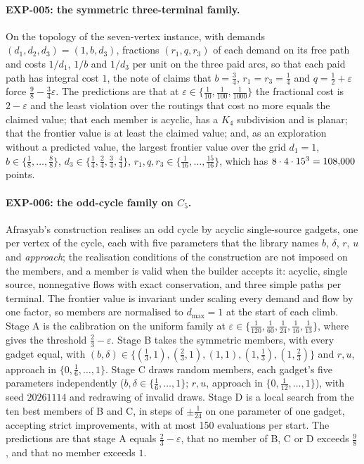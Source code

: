 \documentclass[11pt]{article}
\theoremstyle{remark}
\newcommand{\EXP}[1]{\mbox{EXP-#1}}
\newcommand{\dmax}{d_{\max}}
\begin{document}
\paragraph{\EXP{005}: the symmetric three-terminal family.} On the topology of the seven-vertex instance, with demands $(d_1,d_2,d_3)=(1,b,d_3)$, fractions $(r_1,q,r_3)$ of each demand on its free path and costs $1/d_1$, $1/b$ and $1/d_3$ per unit on the three
paid arcs, so that each paid path has integral cost $1$, the note of \cite{Muf26} claims that $b=\tfrac34$, $r_1=r_3=\tfrac14$ and $q=\tfrac12+\varepsilon$ force $\tfrac98-\tfrac34\varepsilon$. The predictions are that at $\varepsilon\in\{\tfrac1{10},\tfrac1{100},\tfrac1{1000}\}$
the fractional cost is $2-\varepsilon$ and the least violation over the routings that cost no more equals the claimed value; that each member is acyclic, has a $K_4$ subdivision and is planar; that the frontier value is at least the claimed value; and, as an exploration without a predicted value,
the largest frontier value over the grid $d_1=1$, $b\in\{\tfrac18,\dots,\tfrac88\}$, $d_3\in\{\tfrac14,\tfrac24,\tfrac34,\tfrac44\}$, $r_1,q,r_3\in\{\tfrac1{16},\dots,\tfrac{15}{16}\}$, which has $8\cdot4\cdot15^3=108{,}000$ points.

\paragraph{\EXP{006}: the odd-cycle family on $C_5$.} Afrasyab's construction \cite{Afr26} realises an odd cycle by acyclic single-source gadgets, one per vertex of the cycle, each with five parameters that the library
names $b$, $\delta$, $r$, $u$ and \emph{approach}; the realisation conditions of the construction are not imposed on the members, and a member is valid when the builder accepts it: acyclic, single source, nonnegative flows with exact
conservation, and three simple paths per terminal. The frontier value is invariant under scaling every demand and flow by one factor, so members are normalised to $\dmax=1$ at the start of each climb. Stage A is the calibration on the uniform family at
$\varepsilon\in\{\tfrac1{120},\tfrac1{60},\tfrac1{24},\tfrac1{16},\tfrac1{13}\}$, where \cite{Afr26} gives the threshold $\tfrac23-\varepsilon$. Stage B takes the symmetric members, with every gadget equal, with $(b,\delta)\in\{(\tfrac13,1),(\tfrac23,1),(1,1),(1,\tfrac13),(1,\tfrac23)\}$ and $r,u$, approach in $\{0,\tfrac16,\dots,1\}$. Stage C draws random members,
each gadget's five parameters independently ($b,\delta\in\{\tfrac16,\dots,1\}$; $r,u$, approach in $\{0,\tfrac1{12},\dots,1\}$), with seed $20261114$ and redrawing of invalid draws. Stage D is a local search from the ten best members of B and C, in steps of $\pm\tfrac1{24}$ on one parameter of one gadget, accepting strict improvements, with at most 150 evaluations per start.
The predictions are that stage A equals $\tfrac23-\varepsilon$, that no member of B, C or D exceeds $\tfrac98$, and that no member exceeds $1$.
\end{document}
